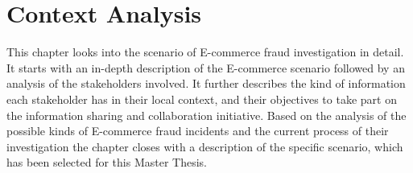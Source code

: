
\chapter{Context Analysis} %
\label{cha:context_analysis}

This chapter looks into the scenario of \gls{E-commerce} fraud investigation in detail. It starts with an in-depth description of the \gls{E-commerce} scenario followed by an analysis of the stakeholders involved. It further describes the kind of information each stakeholder has in their local context, and their objectives to take part on the information sharing and collaboration initiative. Based on the analysis of the possible kinds of \gls{E-commerce} fraud incidents and the current process of their investigation the chapter closes with a description of the specific scenario, which has been selected for this Master Thesis.











